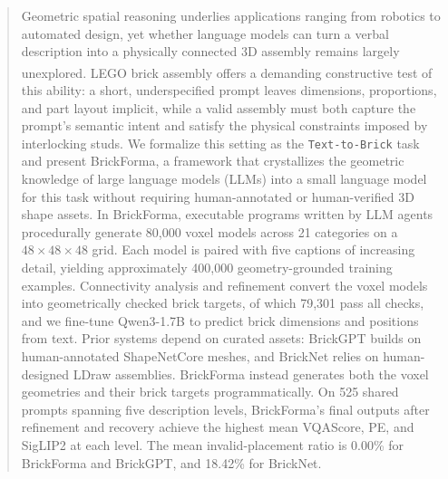\begin{abstract}
Geometric spatial reasoning underlies applications ranging from robotics to automated design, yet whether language models can turn a verbal description into a physically connected 3D assembly remains largely unexplored. LEGO\textsuperscript{\tiny\textregistered} brick assembly offers a demanding constructive test of this ability: a short, underspecified prompt leaves dimensions, proportions, and part layout implicit, while a valid assembly must both capture the prompt's semantic intent and satisfy the physical constraints imposed by interlocking studs. We formalize this setting as the \texttt{Text-to-Brick} task and present BrickForma, a framework that crystallizes the geometric knowledge of large language models (LLMs) into a small language model for this task without requiring human-annotated or human-verified 3D shape assets. In BrickForma, executable programs written by LLM agents procedurally generate 80,000 voxel models across 21 categories on a $48\times48\times48$ grid. Each model is paired with five captions of increasing detail, yielding approximately 400,000 geometry-grounded training examples. Connectivity analysis and refinement convert the voxel models into geometrically checked brick targets, of which 79,301 pass all checks, and we fine-tune Qwen3-1.7B to predict brick dimensions and positions from text. Prior systems depend on curated assets: BrickGPT builds on human-annotated ShapeNetCore meshes, and BrickNet relies on human-designed LDraw assemblies. BrickForma instead generates both the voxel geometries and their brick targets programmatically. On 525 shared prompts spanning five description levels, BrickForma's final outputs after refinement and recovery achieve the highest mean VQAScore, PE, and SigLIP2 at each level. The mean invalid-placement ratio is 0.00\% for BrickForma and BrickGPT, and 18.42\% for BrickNet.
\end{abstract}
